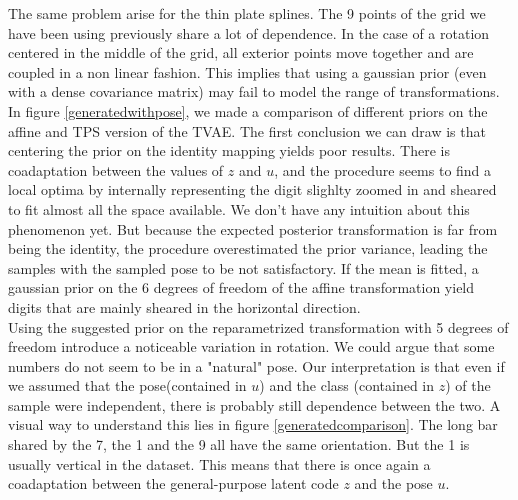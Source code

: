 \documentclass[letterpaper, twoside]{article}
\begin{document}
  The same problem arise for the thin plate splines. The 9 points of the grid we have been using previously share a lot of dependence. In the case of a rotation centered in the middle of the grid, all exterior points move together and are coupled in a non linear fashion. This implies that using a gaussian prior (even with a dense covariance matrix) may fail to model the range of transformations.\\

  In figure \ref{generatedwithpose}, we made a comparison of different priors on the affine and TPS version of the TVAE. The first conclusion we can draw is that centering the prior on the identity mapping yields poor results. There is coadaptation between the values of $z$ and $u$, and the procedure seems to find a local optima by internally representing the digit slighlty zoomed in and sheared to fit almost all the space available. We don't have any intuition about this phenomenon yet. But because the expected posterior transformation is far from being the identity, the procedure overestimated the prior variance, leading the samples with the sampled pose to be not satisfactory. If the mean is fitted, a gaussian prior on the 6 degrees of freedom of the affine transformation yield digits that are mainly sheared in the horizontal direction.\\

    Using the suggested prior on the reparametrized transformation with 5 degrees of freedom introduce a noticeable variation in rotation. We could argue that some numbers do not seem to be in a "natural" pose. Our interpretation is that even if we assumed that the pose(contained in $u$) and the class (contained in $z$) of the sample were independent, there is probably still dependence between the two. A visual way to understand this lies in figure \ref{generatedcomparison}. The long bar shared by the 7, the 1 and the 9 all have the same orientation. But the 1 is usually vertical in the dataset. This means that there is once again a coadaptation between the general-purpose latent code $z$ and the pose $u$.
\end{document}
